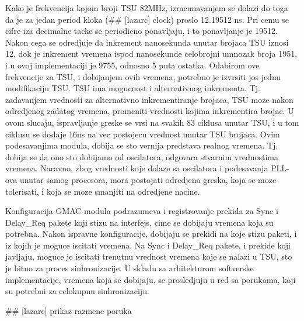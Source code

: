 \documentclass[a4paper,12pt, master]{etf}
\begin{document}
    Kako je frekvencija kojom broji TSU 82MHz, izracunavanjem se dolazi do toga da je za jedan period kloka
    (\#\# [lazarc] clock) proslo 12.19512 ns. Pri cemu se cifre iza decimalne tacke se periodicno ponavljaju,
    i to ponavljanje je 19512. Nakon cega se odredjuje da inkrement nanosekunda unutar brojaca TSU iznosi 12,
    dok je inkrement vremena ispod nanosekunde celobrojni umnozak broja 1951, i u ovoj implementaciji je 9755,
    odnosno 5 puta ostatka. Odabirom ove frekvencije za TSU, i dobijanjem ovih vremena, potrebno je izvrsiti
    jos jednu modifikaciju TSU\@. TSU ima mogucnost i alternativnog inkrementa. Tj\@. zadavanjem vrednosti za
    alternativno inkrementiranje brojaca, TSU moze nakon odredjenog zadatog vremena, promeniti vrednosti
    kojima inkrementira brojac. U ovom slucaju, ispravljanje greske se vrsi na svakih 83 ciklusa unutar TSU,
    i u tom ciklusu se dodaje 16ns na vec postojecu vrednost unutar TSU brojaca. Ovim podesavanjima modula,
    dobija se sto vernija predstava realnog vremena. Tj\@. dobija se da ono sto dobijamo od oscilatora,
    odgovara stvarnim vrednostima vremena. Naravno, zbog vrednosti koje dolaze sa oscilatora i podesavanja
    PLL-ova unutar samog procesora, mora postojati odredjena greska, koja se moze tolerisati, i koja se moze
    smanjiti na odredjene nacine.

    Konfiguracija GMAC modula podrazumeva i registrovanje prekida za Sync i Delay\_Req pakete koji stizu na
    interfejs, cime se dobijaju vremena koja su potrebna. Nakon ispravne konfiguracije, dobijaju se prekidi
    na koje stizu paketi, i iz kojih je moguce iscitati vremena. Na Sync i Delay\_Req pakete, i prekide koji
    javljaju, moguce je iscitati trenutnu vrednost vremena koje se nalazi u TSU, sto je bitno za proces
    sinhronizacije. U skladu sa arhitekturom softverske implementacije, vremena koja se dobijaju, se
    prosledjuju u red sa porukama, koji su potrebni za celokupnu sinhronizaciju.

    \#\# [lazarc] prikaz razmene poruka
\end{document}
